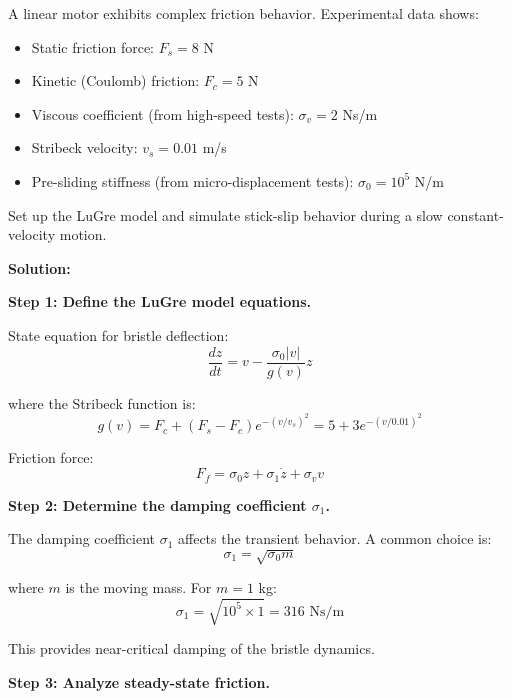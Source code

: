 \begin{example}
\label{ex:lugre_identification}
A linear motor exhibits complex friction behavior. Experimental data shows:
\begin{itemize}
    \item Static friction force: $F_s = 8$ N
    \item Kinetic (Coulomb) friction: $F_c = 5$ N
    \item Viscous coefficient (from high-speed tests): $\sigma_v = 2$ Ns/m
    \item Stribeck velocity: $v_s = 0.01$ m/s
    \item Pre-sliding stiffness (from micro-displacement tests): $\sigma_0 = 10^5$ N/m
\end{itemize}

Set up the LuGre model and simulate stick-slip behavior during a slow constant-velocity motion.

\textbf{Solution:}

\textbf{Step 1: Define the LuGre model equations.}

State equation for bristle deflection:
\begin{equation}
\frac{dz}{dt} = v - \frac{\sigma_0 |v|}{g(v)}z
\end{equation}

where the Stribeck function is:
\begin{equation}
g(v) = F_c + (F_s - F_c)e^{-(v/v_s)^2} = 5 + 3e^{-(v/0.01)^2}
\end{equation}

Friction force:
\begin{equation}
F_f = \sigma_0 z + \sigma_1 \dot{z} + \sigma_v v
\end{equation}

\textbf{Step 2: Determine the damping coefficient $\sigma_1$.}

The damping coefficient $\sigma_1$ affects the transient behavior. A common choice is:
\begin{equation}
\sigma_1 = \sqrt{\sigma_0 m}
\end{equation}

where $m$ is the moving mass. For $m = 1$ kg:
\begin{equation}
\sigma_1 = \sqrt{10^5 \times 1} = 316 \text{ Ns/m}
\end{equation}

This provides near-critical damping of the bristle dynamics.

\textbf{Step 3: Analyze steady-state friction.}


\end{example}
